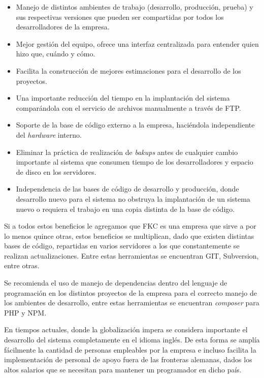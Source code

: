 \begin{itemize}
	\item Manejo de distintos ambientes de trabajo (desarrollo, producción, prueba) y sus respectivas versiones que pueden ser compartidas por todos los desarrolladores de la empresa.
	
	\item Mejor gestión del equipo, ofrece una interfaz centralizada para entender quien hizo que, cuándo y cómo.

	\item Facilita la construcción de mejores estimaciones para el desarrollo de los proyectos.

	\item Una importante reducción del tiempo en la implantación del sistema comparándola con el servicio de archivos manualmente a través de \gls{FTP}.

	\item Soporte de la base de código externo a la empresa, haciéndola independiente del \emph{hardware} interno.

	\item Eliminar la práctica de realización de \emph{bakups} antes de cualquier cambio importante al sistema que consumen tiempo de los desarrolladores y espacio de disco en los servidores.

	\item Independencia de las bases de código de desarrollo y producción, donde desarrollo nuevo para el sistema no obstruya la implantación de un sistema nuevo o requiera el trabajo en una copia distinta de la base de código.
\end{itemize}

Si a todos estos beneficios le agregamos que \gls{FKC} es una empresa que sirve a por lo menos quince otras, estos beneficios se multiplican, dado que existen distintas bases de código, repartidas en varios servidores a los que constantemente se realizan actualizaciones. Entre estas herramientas se encuentran GIT, Subversion, entre otras.

Se recomienda el uso de manejo de dependencias dentro del lenguaje de programación en los distintos proyectos de la empresa para el correcto manejo de los ambientes de desarrollo, entre estas herramientas se encuentran \emph{composer} para PHP y \gls{NPM}. 

En tiempos actuales, donde la globalización impera se considera importante el desarrollo del sistema completamente en el idioma inglés. De esta forma se amplía fácilmente la cantidad de personas empleables por la empresa e incluso facilita la implementación de personal de apoyo fuera de las fronteras alemanas, dados los altos salarios que se necesitan para mantener un programador en dicho país.

